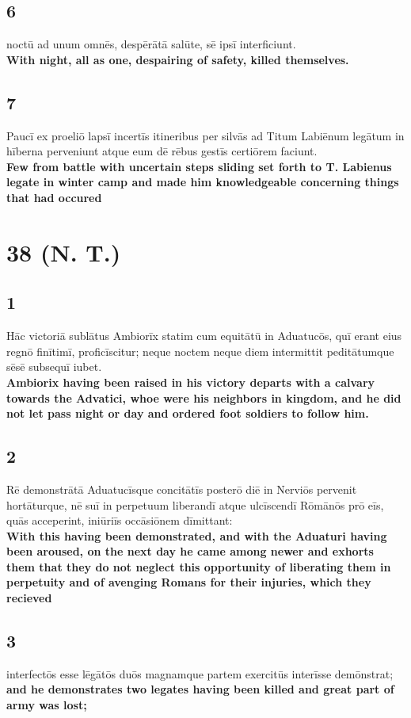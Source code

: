 \documentclass{article}
\begin{document}
\subsection*{6}
noctū ad unum omnēs, despērātā salūte, sē ipsī interficiunt.  \\
\textbf{With night, all as one, despairing of safety, killed themselves.}

\subsection*{7}
Paucī ex proeliō lapsī incertīs itineribus per silvās ad Titum Labiēnum legātum in hīberna perveniunt atque eum dē rēbus gestīs certiōrem faciunt. \\
\textbf{Few from battle with uncertain steps sliding set forth to T. Labienus legate in winter camp and made him knowledgeable concerning things that had occured}


\section*{38 (N. T.)}
\subsection*{1}
Hāc victoriā sublātus Ambiorīx statim cum equitātū in Aduatucōs, quī erant eius regnō finītimī, proficīscitur; neque noctem neque diem intermittit peditātumque sēsē subsequī iubet. \\
\textbf{Ambiorix having been raised in his victory departs with a calvary towards the Advatici, whoe were his neighbors in kingdom, and he did not let pass night or day and ordered foot soldiers to follow him.}

\subsection*{2} 
Rē demonstrātā Aduatucīsque concitātīs posterō diē in Nerviōs pervenit hortāturque, nē suī in perpetuum liberandī atque ulcīscendī Rōmānōs prō eīs, quās acceperint, iniūriīs occāsiōnem dīmittant: \\
\textbf{With this having been demonstrated, and with the Aduaturi having been aroused, on the next day he came among newer and exhorts them that they do not neglect this opportunity of liberating them in perpetuity and of avenging Romans for their injuries, which they recieved}

\subsection*{3}
interfectōs esse lēgātōs duōs magnamque partem exercitūs interīsse demōnstrat;\\
\textbf{and he demonstrates two legates having been killed and great part of army was lost;}
\end{document}

